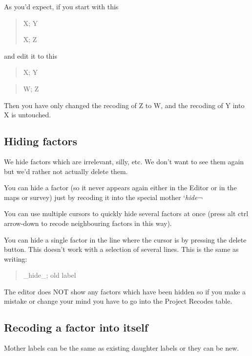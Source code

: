 \documentclass[
]{book}
\begin{document}
As you'd expect, if you start with this

\begin{quote}
X; Y

X; Z
\end{quote}

and edit it to this

\begin{quote}
X; Y
\end{quote}

\begin{quote}
W; Z
\end{quote}

Then you have only changed the recoding of Z to W, and the recoding of Y into X is untouched.

\hypertarget{hiding-factors}{%
\subsection{Hiding factors}\label{hiding-factors}}

We hide factors which are irrelevant, silly, etc. We don't want to see them again but we'd rather not actually delete them.

You can hide a factor (so it never appears again either in the Editor or in the maps or survey) just by recoding it into the special mother `\emph{hide}¬

You can use multiple cursors to quickly hide several factors at once (press alt ctrl arrow-down to recode neighbouring factors in this way).

You can hide a single factor in the line where the cursor is by pressing the delete button. This doesn't work with a selection of several lines. This is the same as writing:

\begin{quote}
\_hide\_; old label
\end{quote}

The editor does NOT show any factors which have been hidden so if you make a mistake or change your mind you have to go into the Project Recodes table.

\hypertarget{recoding-a-factor-into-itself}{%
\subsection{Recoding a factor into itself}\label{recoding-a-factor-into-itself}}

Mother labels can be the same as existing daughter labels or they can be new.
\end{document}

